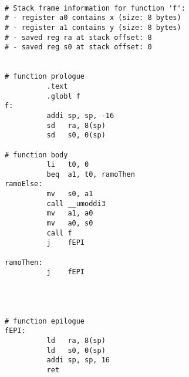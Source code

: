 
\begin{verbatim}

# Stack frame information for function 'f':
# - register a0 contains x (size: 8 bytes)
# - register a1 contains y (size: 8 bytes)
# - saved reg ra at stack offset: 8
# - saved reg s0 at stack offset: 0


# function prologue
          .text
          .globl f
f:
          addi sp, sp, -16
          sd   ra, 8(sp)
          sd   s0, 0(sp)

# function body
          li   t0, 0
          beq  a1, t0, ramoThen
ramoElse:
          mv   s0, a1
          call __umoddi3
          mv   a1, a0
          mv   a0, s0
          call f
          j    fEPI

ramoThen:
          j    fEPI




# function epilogue
fEPI:
          ld   ra, 8(sp)
          ld   s0, 0(sp)
          addi sp, sp, 16
          ret
\end{verbatim}